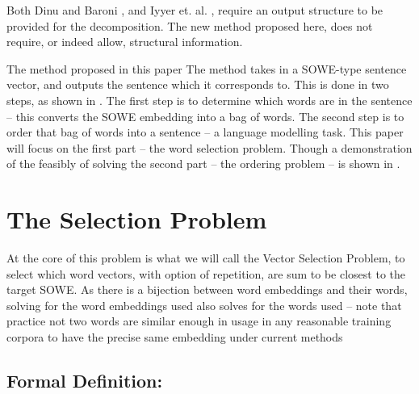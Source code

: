 \documentclass[]{scrartcl}
\numberwithin{equation}{section}
\numberwithin{figure}{section}
\theoremstyle{plain}
\theoremstyle{definition}
\begin{document}
Both Dinu and Baroni \cite{Dinu2014CompositionalGeneration}, and Iyyer et. al. \cite{iyyer2014generating}, require an output structure to be provided for the decomposition.
The new method proposed here, does not require, or indeed allow, structural information.



The method proposed in this paper The method takes in a SOWE-type sentence vector, and outputs the sentence which it corresponds to.
This is done in two steps, as shown in .
The first step is to determine which words are in the sentence -- this converts the SOWE embedding into a bag of words.
The second step is to order that bag of words into a sentence -- a language modelling task.
This paper will focus on the first part -- the word selection problem. 
Though a demonstration of the feasibly of solving the second part -- the ordering problem --  is shown in .

\section {The Selection Problem}


At the core of this problem is what we will call the Vector Selection Problem, to select which word vectors, with option of repetition, are sum to be closest to the target SOWE.
As there is a bijection between word embeddings and their words, solving for the word embeddings used also solves for the words used -- note that practice not two words are similar enough in usage in any reasonable training corpora to have the precise same embedding under current methods

\subsection{Formal Definition: }
\renewcommand{\c}{\tilde{c}}
\newcommand{\s}{\tilde{s}}
\newcommand{\x}{\tilde{x}}
\renewcommand{\t}{\tilde{t}}
\newcommand{\N}{\mathbb{N}}
\newcommand{\R}{\mathbb{R}}
\newcommand{\V}{\mathcal{V}}
\end{document}
